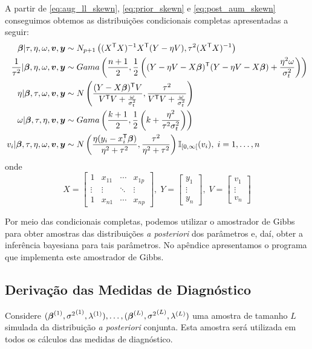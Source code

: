 A partir de \eqref{eq:aug_ll_skewn}, \eqref{eq:prior_skewn} e \eqref{eq:post_aum_skewn} conseguimos obtemos as distribuições condicionais completas apresentadas a seguir:
\begin{equation}
\begin{split}
{\boldsymbol{\beta}}|\tau,\eta,\omega,{\boldsymbol{v}},{\boldsymbol{y}} & \sim N_{p+1}\left((X^{\mathsf{T}} X)^{-1}X^{\mathsf{T}}(Y-\eta V),\tau^2(X^{\mathsf{T}} X)^{-1}\right) \\
\frac{1}{\tau^2}|{\boldsymbol{\beta}},\eta,\omega,{\boldsymbol{v}},{\boldsymbol{y}} & \sim Gama\left(\frac{n+1}{2},\frac{1}{2}\left((Y-\eta V-X{\boldsymbol{\beta}})^{\mathsf{T}}(Y-\eta V-X{\boldsymbol{\beta}})+\frac{\eta^2\omega}{\sigma_t^2}\right)\right) \\
\eta|{\boldsymbol{\beta}},\tau,\omega,{\boldsymbol{v}},{\boldsymbol{y}} & \sim N\left(\frac{(Y-X{\boldsymbol{\beta}})^{\mathsf{T}} V}{V^{\mathsf{T}} V+\frac{\omega}{\sigma_t^2}},\frac{\tau^2}{V^{\mathsf{T}} V+\tfrac{\omega}{\sigma_t^2}}\right)\\
\omega|{\boldsymbol{\beta}},\tau,\eta,{\boldsymbol{v}},{\boldsymbol{y}} & \sim Gama\left(\frac{k+1}{2},\frac{1}{2}\left(k+\frac{\eta^2}{{\tau^2}\sigma_t^2}\right)\right)\\
v_i|{\boldsymbol{\beta}},\tau,\eta,\omega,{\boldsymbol{v}},{\boldsymbol{y}} & \sim N\left(\frac{\eta(y_i-x_i^{\mathsf{T}}{\boldsymbol{\beta}})}{\eta^2+\tau^2},\frac{\tau^2}{\eta^2+\tau^2}\right)\mathbb{I}_{[0,\infty[}(v_i),\; i=1,\ldots,n
\end{split}
\end{equation}
onde
\begin{equation}
X=\begin{bmatrix}
1 & x_{11} & \cdots & x_{1p} \\
\vdots & \vdots & \ddots & \vdots \\
1 & x_{n1} & \cdots & x_{np}
\end{bmatrix},\;
Y=\begin{bmatrix}
y_1 \\
\vdots\\
y_n
\end{bmatrix},\;
V=\begin{bmatrix}
v_1 \\
\vdots\\
v_n
\end{bmatrix}
\end{equation}

Por meio das condicionais completas, podemos utilizar o amostrador de Gibbs para obter amostras das distribuições \textit{a posteriori} dos parâmetros e, daí, obter a inferência bayesiana para tais parâmetros. No apêndice apresentamos o programa que implementa este amostrador de Gibbs.

\subsection{Derivação das Medidas de Diagnóstico}
Considere $({\boldsymbol{\beta}}^{(1)},{\sigma^2}^{(1)},\lambda^{(1)}),\ldots,
({\boldsymbol{\beta}}^{(L)},{\sigma^2}^{(L)},\lambda^{(L)})$ uma amostra de tamanho $L$ simulada da distribuição \textit{a posteriori} conjunta. Esta amostra será utilizada em todos os cálculos das medidas de diagnóstico.

